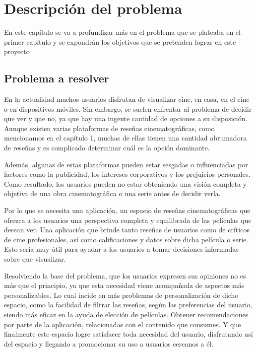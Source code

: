 \chapter{Descripción del problema}

En este capítulo se va a profundizar más en el problema que se plateaba en el primer capítulo y se 
expondrán los objetivos que se pretenden lograr en este proyecto

\section{Problema a resolver}

En la actualidad muchos usuarios disfrutan de visualizar cine, en casa, en el cine o en 
dispositivos móviles. Sin embargo, se suelen enfrentar al problema de decidir que ver y que no, ya que 
hay una ingente cantidad de opciones a su disposición. Aunque existen varias plataformas de reseñas 
cinematográficas, como mencionamos en el capítulo 1, muchas de ellas tienen una cantidad abrumadora de 
reseñas y es complicado determinar cuál es la opción dominante.

Además, algunas de estas plataformas pueden estar sesgadas o influenciadas por factores como la 
publicidad, los intereses corporativos y los prejuicios personales. Como resultado, los usuarios pueden 
no estar obteniendo una visión completa y objetiva de una obra cinematográfica o una serie antes de 
decidir verla.

Por lo que se necesita una aplicación, un espacio de reseñas cinematográficas que ofrezca a los 
usuarios una perspectiva completa y equilibrada de las películas que desean ver. Una 
aplicación que brinde tanto reseñas de usuarios como de críticos de cine profesionales, así como 
calificaciones y datos sobre dicha película o serie. Esto sería muy útil para ayudar a los usuarios a 
tomar decisiones informadas sobre que visualizar.

Resolviendo la base del problema, que los usuarios expresen sus opiniones no es más que el principio, 
ya que esta necesidad viene acompañada de aspectos más personalizables. Lo cual incide en más problemas 
de personalización de dicho espacio, como la facilidad de filtrar las reseñas, según las preferencias 
del usuario, siendo más eficaz en la ayuda de elección de películas. Obtener recomendaciones 
por parte de la aplicación, relacionadas con el contenido que consumes. Y que finalmente este espacio 
logre satisfacer toda necesidad del usuario, disfrutando así del espacio y llegando a promocionar su 
uso a usuarios cercanos a él.


